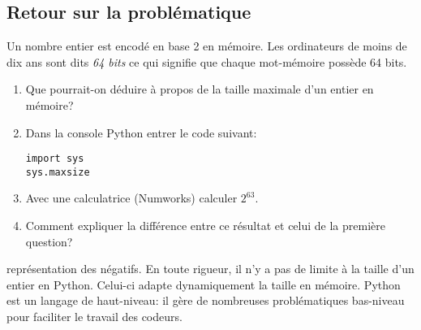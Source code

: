 \documentclass[a4paper,11pt]{article}
\begin{document}
\begin{Form}
\section{Retour sur la problématique}
Un nombre entier est encodé en base 2 en mémoire. Les ordinateurs de moins de dix ans sont dits \emph{64 bits} ce qui signifie que chaque mot-mémoire possède 64 bits.
\begin{activite}
\begin{enumerate}
\item Que pourrait-on déduire à propos de la taille maximale d'un entier en mémoire?
\item Dans la console Python entrer le code suivant:
\begin{lstlisting}
import sys
sys.maxsize
\end{lstlisting}
\item Avec une calculatrice (Numworks) calculer $2^{63}$.
\item Comment expliquer la différence entre ce résultat et celui de la première question?
\end{enumerate}
\end{activite}
\begin{commentprof}
représentation des négatifs. En toute rigueur, il n'y a pas de limite à la taille d'un entier en Python. Celui-ci adapte dynamiquement la taille en mémoire. Python est un langage de haut-niveau: il gère de nombreuses problématiques bas-niveau pour faciliter le travail des codeurs.
\end{commentprof}
\end{Form}
\end{document}
